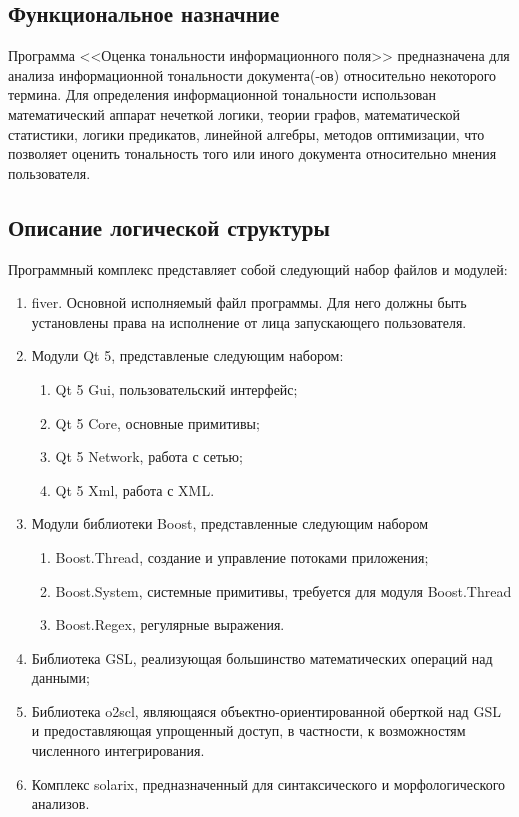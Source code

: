 \documentclass[a4paper,14pt,russian]{extreport}
\begin{document}
\subsection{Функциональное назначние}

Программа <<Оценка тональности информационного поля>> предназначена для анализа информационной тональности документа(-ов) относительно некоторого термина. Для определения информационной тональности использован математический аппарат нечеткой логики, теории графов, математической статистики, логики предикатов, линейной алгебры, методов оптимизации, что позволяет оценить тональность того или иного документа относительно мнения пользователя.

\subsection{Описание логической структуры}

Программный комплекс представляет собой следующий набор файлов и модулей:

\begin{enumerate}
\item fiver. Основной исполняемый файл программы. Для него должны быть установлены права на исполнение от лица запускающего пользователя.
\item Модули Qt 5, представленые следующим набором:
\begin{enumerate}
\item Qt 5 Gui, пользовательский интерфейс;
\item Qt 5 Core, основные примитивы;
\item Qt 5 Network, работа с сетью;
\item Qt 5 Xml, работа с XML.
\end{enumerate}
\item Модули библиотеки Boost, представленные следующим набором
\begin{enumerate}
\item Boost.Thread, создание и управление потоками приложения;
\item Boost.System, системные примитивы, требуется для модуля Boost.Thread
\item Boost.Regex, регулярные выражения.
\end{enumerate}
\item Библиотека GSL, реализующая большинство математических операций над данными;
\item Библиотека o2scl, являющаяся объектно-ориентированной оберткой над GSL и предоставляющая упрощенный доступ, в частности, к возможностям численного интегрирования.
\item Комплекс solarix, предназначенный для синтаксического и морфологического анализов.
\end{enumerate}
\end{document}
